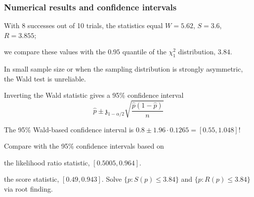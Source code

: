 \documentclass{beamer}
\begin{document}
 \begin{frame}[fragile]
 \frametitle{Numerical results and confidence intervals}
 \bi 
 \item With 8 successes out of 10 trials, the statistics equal $W=5.62$, $S=3.6$, $R = 3.855$;
 \item we compare these values with the $0.95$ quantile of the $\chi^2_1$ distribution, $3.84$.
 \ei
 \bi \item 
In small sample size or when the sampling distribution is strongly asymmetric, the Wald test is \alert{unreliable}.
\item 
 Inverting the Wald statistic gives a 95\% confidence interval \[\widehat{p} \pm \mathfrak{z}_{1-\alpha/2}\sqrt{\frac{\widehat{p}(1-\widehat{p})}{n}}\]
 \item The 95\% Wald-based confidence interval is $0.8 \pm 1.96 \cdot 0.1265 = [0.55, 1.048]$!
 \item Compare with the 95\% confidence intervals based on
 \bi \item the likelihood ratio statistic, $[0.5005, 0.964]$.
 \item the score statistic, $[0.49, 0.943]$.
  \ei 
  \ei 
  {\footnotesize Solve $\{p: S(p) \leq 3.84\}$ and $\{p: R(p) \leq 3.84\}$ via root finding.}
\end{frame}
\end{document}
